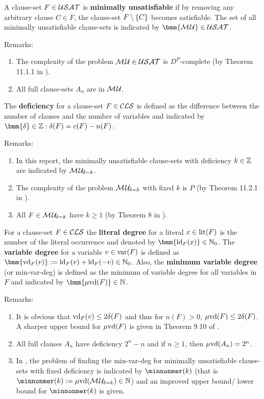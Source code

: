 \documentclass{report}
\begin{document}
\begin{defi}\label{def:mu}
A clause-set $F \in \mathcal{USAT}$ is \textbf{minimally unsatisfiable} if by removing any arbitrary clause $C \in F$, the clause-set $F \setminus \{ C \}$ becomes satisfiable. The set of all minimally unsatisfiable clause-sets is indicated by $\bmm{\Musat} \in \Usat$.
\end{defi}
Remarks:
  \begin{enumerate}
  \item The complexity of the problem $\mathcal{M\hspace{0.8pt}U} \in \mathcal{USAT}$ is $D^P$-complete (by Theorem 11.1.1 in \cite{Kullmann2007HandbuchMU}).
  \item All full clause-sets $ A_n$ are in $\mathcal{M\hspace{0.8pt}U}_{\!}$.
  \end{enumerate}

\begin{defi}\label{def:deficiency}
The \textbf{deficiency} for a clause-set $F \in \mathcal{CLS}$ is defined as the difference between the number of clauses and the number of variables and indicated by $\bmm{\delta} \in \ZZ: \delta(F)= c(F) - n(F)$.
\end{defi}
Remarks:
  \begin{enumerate}
  \item In this report, the minimally unsatisfiable clause-sets with deficiency $k \in \mathbb{Z}$ are indicated by $\mathcal{M\hspace{0.8pt}U}_{\!\delta=k}$.
  \item The complexity of the problem $\mathcal{M\hspace{0.8pt}U}_{\!\delta=k}$ with fixed $k$ is $P$ (by Theorem 11.2.1 in \cite{Kullmann2007HandbuchMU}).
  \item All $F \in \mathcal{M\hspace{0.8pt}U}_{\!\delta=k}$ have $k \ge 1$ (by Theorem 8 in \cite{DDK98}).
  \end{enumerate}

\begin{defi}\label{def:degree}
For a clause-set $F \in \mathcal{CLS}$ the \textbf{literal degree} for a literal $x \in \operatorname{lit}(F)$ is the number of the literal occurrence and denoted by $\bmm{\ldeg_F(x)} \in \NNZ$. The \textbf{variable degree} for a variable $v \in \operatorname{var}(F)$ is defined as $\bmm{\vdeg_F(v)} := \ldeg_F(v) + \ldeg_F(-v) \in \NNZ$. Also, the \textbf{minimum variable degree} (or min-var-deg) is defined as the minimum of variable degree for all variables in $F$ and indicated by $\bmm{\minvdeg(F)} \in \NN$.
\end{defi}
Remarks:
  \begin{enumerate}
  \item It is obvious that $\operatorname{vd}_F(v) \le 2 \delta(F)$ and thus for $n(F) >0$, $\operatorname{\mu\!\operatorname{vd}}(F) \le 2 \delta(F)$. A sharper upper bound for $\operatorname{\mu\!\operatorname{vd}}(F)$ is given in Theorem 9.10 of \cite{KullmannZhao2010Extremal}.
  \item All full clauses $A_n$ have deficiency $2^n - n$ and if $n \ge 1$, then  $\operatorname{\mu\!\operatorname{vd}}(A_n) =2^n$.
  \item In \cite{KullmannZhao2010Extremal}, the problem of finding the min-var-deg for minimally unsatisfiable clause-sets with fixed deficiency is indicated by $\minnonmer(k) $ (that is $\minnonmer(k)  :=  \minvdeg(\Musati{\delta=k}) \in \NN$) and an improved upper bound/ lower bound for $\minnonmer(k) $ is given.
    \end{enumerate}
    
\end{document}
